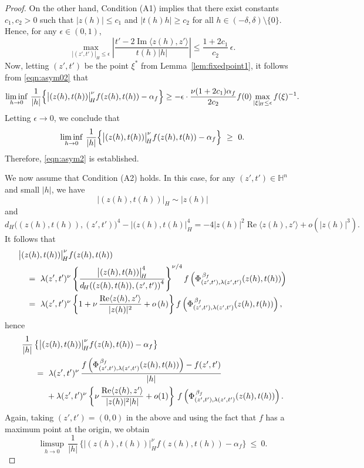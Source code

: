 \documentclass[reqno]{amsart}
\theoremstyle{definition}
\theoremstyle{remark}
\numberwithin{equation}{section}
\begin{document}
\begin{proof}
On the other hand, Condition (A1) implies that there exist constants $c_1, c_2 > 0$ such that $|z(h)| \leq c_1$ and $|t(h) h| \geq c_2$ for all $h \in (-\delta, \delta) \setminus \{0\}$. Hence, for any $\epsilon \in (0, 1)$,
\[
\max_{|(z', t')|_{\! H} \leq \epsilon} \left| \frac{t' - 2 \operatorname{Im} \langle z(h), z' \rangle}{t(h) |h|} \right|
\leq \frac{1 + 2c_1}{c_2} \, \epsilon.
\]
Now, letting $(z', t')$ be the point $\xi^*$ from Lemma~\ref{lem:fixedpoint1}, it follows from \eqref{eqn:asym02} that
\begin{equation*}
\liminf_{h \to 0} \, \frac{1}{|h|} \Bigl\{ \bigl|(z(h),t(h)) \bigr|_{\! H}^{\nu} f(z(h), t(h)) - \alpha_f \Bigr\}
\geq - \epsilon \cdot \frac{\nu (1 + 2c_1) \alpha_f}{2 c_2} f(0) \max_{|\xi|_{\! H} \leq \epsilon} f(\xi)^{-1}.
\end{equation*}
Letting $\epsilon \to 0$, we conclude that
\begin{equation}
\liminf_{h \to 0} \, \frac{1}{|h|} \Bigl\{ \bigl|(z(h),t(h)) \bigr|_{\! H}^{\nu} f(z(h), t(h)) 
- \alpha_f \Bigr\} ~\geq~ 0.
\end{equation}
Therefore, \eqref{eqn:asym2} is established.

We now assume that Condition (A2) holds. In this case, for any $(z',t') \in \mathbb{H}^{n}$
and small $|h|$, we have
\[
\bigl|(z(h),t(h)) \bigr|_{\! H} \sim |z(h)|
\]
and
\[
d_{\! H}  \bigl((z(h), t(h)), (z', t')\bigr)^4 - \bigl|(z(h), t(h)\bigr|_{\! H}^4
= - 4 |z(h)|^2 \operatorname{Re} \langle z(h), z'\rangle 
+ o(|z(h)|^3).
\]
It follows that
\begin{align}
& \bigl|(z(h),t(h)) \bigr|_{\! H}^{\nu} f(z(h),t(h)) \notag\\
&\quad =~ \lambda(z',t')^{\nu} \left\{ \frac {\bigl|(z(h),t(h)) \bigr|_{\! H}^4} 
{d_{\! H} \! \left((z(h), t(h)), \left(z', t'\right)\right)^4}\right\}^{\nu/4} 
f\left(\Phi_{(z',t'),\lambda(z',t')}^{\, \beta_f} (z(h),t(h))\right) \notag\\
&\quad =~ \lambda(z',t')^{\nu} \left\{ 1+ \nu\, 
\frac {\operatorname{Re} \langle z(h), z'\rangle} {|z(h)|^2}
+ o \left( h \right) \right\} 
f\left(\Phi_{(z',t'),\lambda(z',t')}^{\, \beta_f} (z(h),t(h))\right), \notag
\end{align}
hence
\begin{align}
&\frac {1}{|h|} \, \big\{ \bigl|(z(h),t(h)) \bigr|_{\! H}^{\nu} f(z(h),t(h)) - \alpha_f \big\}\notag\\
& \quad \; ~=~ \lambda(z',t')^{\nu} \, \frac {f\left(\Phi_{(z', t'), \lambda(z',t')}^{\, \beta_f}
(z(h),t(h))\right) -f(z',t')}{|h|} \notag\\
& \qquad \quad + \lambda(z',t')^{\nu} \left\{  \nu\, 
\frac {\operatorname{Re} \langle z(h), z'\rangle} {|z(h)|^2 |h|}  + o(1) \right\} \, f\left(\Phi_{(z',t'),\lambda(z',t')}^{\, \beta_f} (z(h),t(h))\right).  \label{eqn:asym01}
\end{align}
Again, taking $(z',t')=(0,0)$ in the above and using the fact that $f$ has a maximum point at the origin, we obtain
\begin{equation}\label{eqn:limsup2}
\limsup_{h\to 0}\, \frac {1}{|h|} \, \Big\{ \bigl|(z(h),t(h))\bigr|_{\! H}^{\nu} f(z(h),t(h)) - \alpha_f \Big\} ~\leq~ 0.
\end{equation}


\end{proof}
\end{document}
